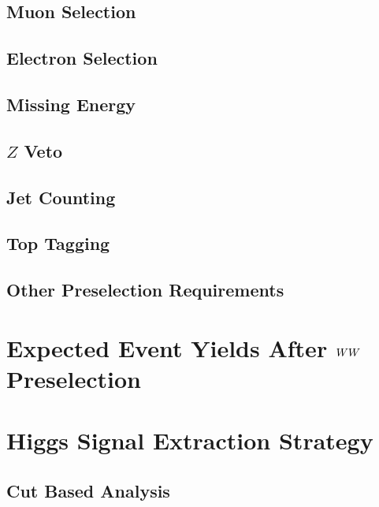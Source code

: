 \documentclass{cmspaper}
\begin{document}
  \subsection{Muon Selection} 
    \label{sec:sel_muons}
   
  \subsection{Electron Selection} 
    \label{sec:sel_electrons}
    
  \subsection{Missing Energy} 
    \label{sec:sel_met}
    
    \clearpage
  \subsection{$Z$ Veto}
    \label{sec:sel_zveto}
    
  \subsection{Jet Counting} 
    \label{sec:sel_jets}
    
  \subsection{Top Tagging}
    \label{sec:sel_toptag}
    
  \subsection{Other Preselection Requirements}
    \label{sec:sel_other}
    

\section{Expected Event Yields After $WW$ Preselection}
  \label{sec:yields}
  

\clearpage    
\section{Higgs Signal Extraction Strategy}
  
  \label{sec:signal_selection}
  \subsection{Cut Based Analysis}
    \label{sec:anal_cutbased}
\end{document}
